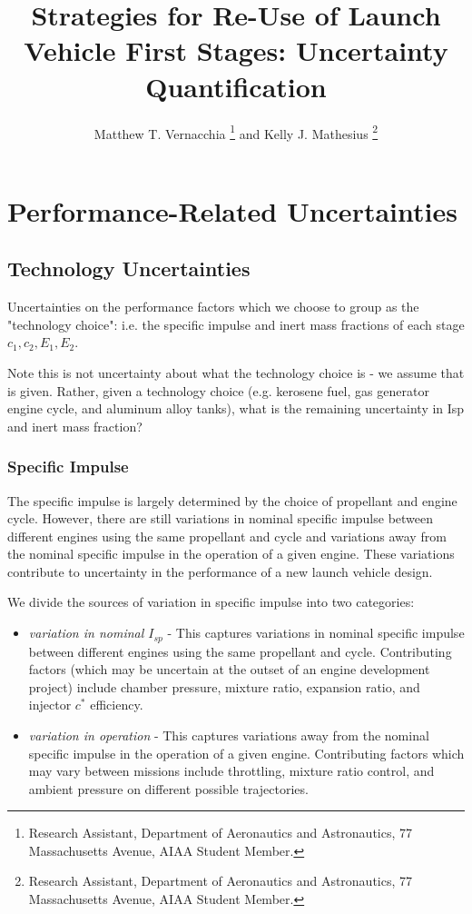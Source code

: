 \documentclass[conf]{../new-aiaa}
\title{Strategies for Re-Use of Launch Vehicle First Stages: Uncertainty Quantification}
\author{Matthew T. Vernacchia \footnote{Research Assistant, Department of Aeronautics and Astronautics, 77 Massachusetts Avenue, AIAA Student Member.}
and Kelly J. Mathesius  \footnote{Research Assistant, Department of Aeronautics and Astronautics, 77 Massachusetts Avenue, AIAA Student Member.}}
\affil{Massachusetts Institute of Technology, Cambridge, MA, 02139}
\begin{document}
\maketitle

\section{Performance-Related Uncertainties}

\subsection{Technology Uncertainties}
Uncertainties on the performance factors which we choose to group as the "technology choice": i.e. the specific impulse and inert mass fractions of each stage $c_1, c_2, E_1, E_2$.

Note this is not uncertainty about what the technology choice is - we assume that is given. Rather, given a technology choice (e.g. kerosene fuel, gas generator engine cycle, and aluminum alloy tanks), what is the remaining uncertainty in Isp and inert mass fraction?

\subsubsection{Specific Impulse}
The specific impulse is largely determined by the choice of propellant and engine cycle. However, there are still variations in nominal specific impulse between different engines using the same propellant and cycle and variations away from the nominal specific impulse in the operation of a given engine. These variations contribute to uncertainty in the performance of a new launch vehicle design.

We divide the sources of variation in specific impulse into two categories:
\begin{itemize}
    \item \emph{variation in nominal $I_{sp}$} -  This captures variations in nominal specific impulse between different engines using the same propellant and cycle. Contributing factors (which may be uncertain at the outset of an engine development project) include chamber pressure, mixture ratio, expansion ratio, and injector $c^*$ efficiency.
    \item \emph{variation in operation} -  This captures variations away from the nominal specific impulse in the operation of a given engine. Contributing factors which may vary between missions include throttling, mixture ratio control, and ambient pressure on different possible trajectories.
\end{itemize}
\end{document}
